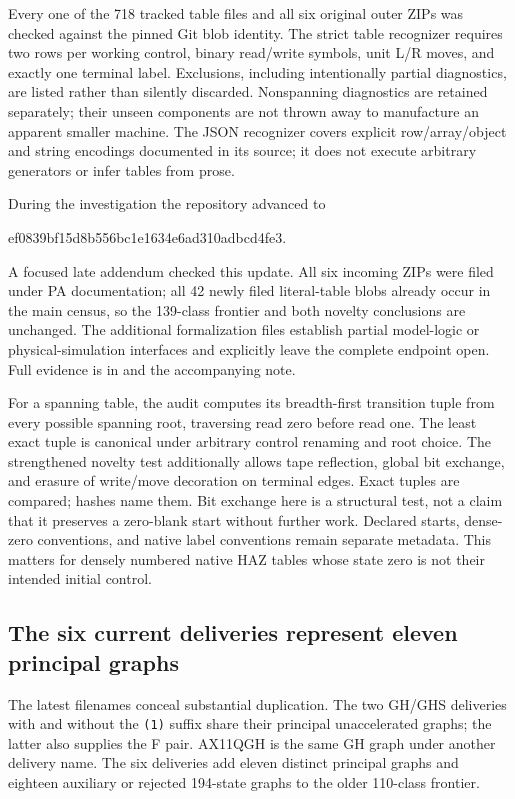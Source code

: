 \documentclass[11pt,letterpaper]{article}
\newcommand{\file}[1]{\path{#1}}
\begin{document}
Every one of the 718 tracked table files and all six original outer ZIPs
was checked against the pinned Git blob identity. The strict table
recognizer requires two rows per working control, binary read/write
symbols, unit L/R moves, and exactly one terminal label. Exclusions,
including intentionally partial diagnostics, are listed rather than
silently discarded. Nonspanning diagnostics are retained separately;
their unseen components are not thrown away to manufacture an apparent
smaller machine. The JSON recognizer covers explicit row/array/object
and string encodings documented in its source; it does not execute
arbitrary generators or infer tables from prose.

During the investigation the repository advanced to
\begin{center}\small\ttfamily
ef0839bf15d8b556bc1e1634e6ad310adbcd4fe3.
\end{center}
A focused late addendum checked this update. All six incoming ZIPs were
filed under PA documentation; all 42 newly filed literal-table blobs
already occur in the main census, so the 139-class frontier and both
novelty conclusions are unchanged. The additional formalization files
establish partial model-logic or physical-simulation interfaces and
explicitly leave the complete endpoint open. Full evidence is in
\file{comparison/late_addendum.json} and the accompanying note.

For a spanning table, the audit computes its breadth-first transition
tuple from every possible spanning root, traversing read zero before
read one. The least exact tuple is canonical under arbitrary control
renaming and root choice. The strengthened novelty test additionally
allows tape reflection, global bit exchange, and erasure of write/move
decoration on terminal edges. Exact tuples are compared; hashes name
them. Bit exchange here is a structural test, not a claim that it
preserves a zero-blank start without further work. Declared starts,
dense-zero conventions, and native label conventions remain separate
metadata. This matters for densely numbered native HAZ tables whose
state zero is not their intended initial control.

\subsection{The six current deliveries represent eleven principal graphs}

The latest filenames conceal substantial duplication. The two GH/GHS
deliveries with and without the \texttt{(1)} suffix share their principal
unaccelerated graphs; the latter also supplies the F pair. AX11QGH is the
same GH graph under another delivery name. The six deliveries add eleven
distinct principal graphs and eighteen auxiliary or rejected 194-state
graphs to the older 110-class frontier.
\end{document}
